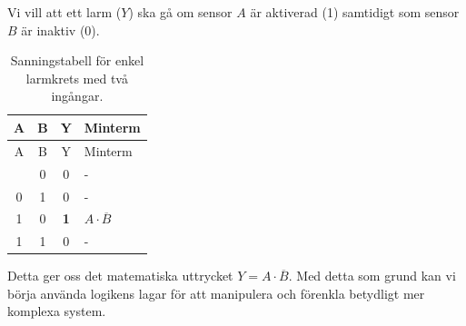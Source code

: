 \documentclass[
  swedish,
  letterpaper,
  oneside,
  openany]{book}
\begin{document}
\begin{tcolorbox}[enhanced jigsaw, arc=.35mm, bottomrule=.15mm, bottomtitle=1mm, breakable, colback=white, colbacktitle=quarto-callout-note-color!10!white, colframe=quarto-callout-note-color-frame, coltitle=black, left=2mm, leftrule=.75mm, opacityback=0, opacitybacktitle=0.6, rightrule=.15mm, title=\textcolor{quarto-callout-note-color}{\faInfo}\hspace{0.5em}{Enkel larmkrets}, titlerule=0mm, toprule=.15mm, toptitle=1mm]

Vi vill att ett larm (\(Y\)) ska gå om sensor \(A\) är aktiverad (1)
samtidigt som sensor \(B\) är inaktiv (0).

\begin{longtable}[]{@{}cccl@{}}
\caption{Sanningstabell för enkel larmkrets med två
ingångar.}\label{tbl-tt-alarm}\tabularnewline
\toprule\noalign{}
A & B & Y & Minterm \\
\midrule\noalign{}
\endfirsthead
\toprule\noalign{}
A & B & Y & Minterm \\
\midrule\noalign{}
\endhead
\bottomrule\noalign{}
\endlastfoot
0 & 0 & 0 & - \\
0 & 1 & 0 & - \\
1 & 0 & \textbf{1} & \(A \cdot \overline{B}\) \\
1 & 1 & 0 & - \\
\end{longtable}

Detta ger oss det matematiska uttrycket \(Y = A \cdot \overline{B}\).
Med detta som grund kan vi börja använda logikens lagar för att
manipulera och förenkla betydligt mer komplexa system.

\end{tcolorbox}
\end{document}
